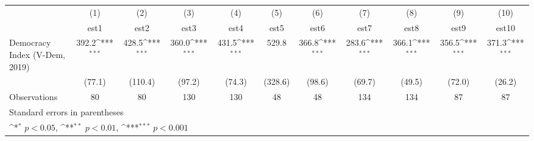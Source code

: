 {
\def\sym#1{\ifmmode^{#1}\else\(^{#1}\)\fi}
\begin{tabular}{l*{10}{c}}
\hline\hline
                    &\multicolumn{1}{c}{(1)}         &\multicolumn{1}{c}{(2)}         &\multicolumn{1}{c}{(3)}         &\multicolumn{1}{c}{(4)}         &\multicolumn{1}{c}{(5)}         &\multicolumn{1}{c}{(6)}         &\multicolumn{1}{c}{(7)}         &\multicolumn{1}{c}{(8)}         &\multicolumn{1}{c}{(9)}         &\multicolumn{1}{c}{(10)}         \\
                    &        est1         &        est2         &        est3         &        est4         &        est5         &        est6         &        est7         &        est8         &        est9         &       est10         \\
\hline
Democracy Index (V-Dem, 2019)&       392.2\sym{***}&       428.5\sym{***}&       360.0\sym{***}&       431.5\sym{***}&       529.8         &       366.8\sym{***}&       283.6\sym{***}&       366.1\sym{***}&       356.5\sym{***}&       371.3\sym{***}\\
                    &      (77.1)         &     (110.4)         &      (97.2)         &      (74.3)         &     (328.6)         &      (98.6)         &      (69.7)         &      (49.5)         &      (72.0)         &      (26.2)         \\
\hline
Observations        &          80         &          80         &         130         &         130         &          48         &          48         &         134         &         134         &          87         &          87         \\
\hline\hline
\multicolumn{11}{l}{\footnotesize Standard errors in parentheses}\\
\multicolumn{11}{l}{\footnotesize \sym{*} \(p<0.05\), \sym{**} \(p<0.01\), \sym{***} \(p<0.001\)}\\
\end{tabular}
}
